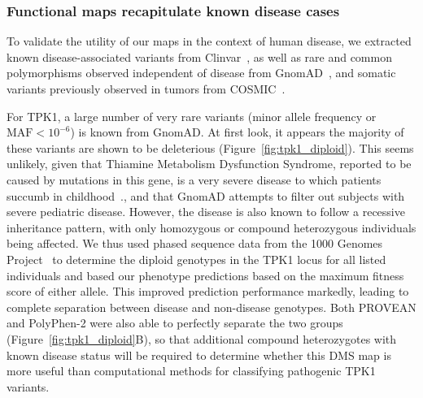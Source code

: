 \subsubsection{Functional maps recapitulate known disease cases}

To validate the utility of our maps in the context of human disease, we extracted known disease-associated variants from Clinvar~\cite{landrum_clinvar:_2016}, as well as rare and common polymorphisms observed independent of disease from GnomAD~\cite{lek_analysis_2016}, and somatic variants previously observed in tumors from COSMIC~\cite{forbes_cosmic:_2001}. 

For TPK1, a large number of very rare variants (minor allele frequency or $\text{MAF} < 10^{-6}$) is known from GnomAD. At first look, it appears the majority of these variants are shown to be deleterious (Figure~\ref{fig:tpk1_diploid}). This seems unlikely, given that Thiamine Metabolism Dysfunction Syndrome, reported to be caused by mutations in this gene, is a very severe disease to which patients succumb in childhood~\cite{mayr_thiamine_2011}., and that GnomAD attempts to filter out subjects with severe pediatric disease. However, the disease is also known to follow a recessive inheritance pattern, with only homozygous or compound heterozygous individuals being affected. We thus used phased sequence data from the 1000 Genomes Project~\cite{the_1000_genomes_project_consortium_global_2015} to determine the diploid genotypes in the TPK1 locus for all listed individuals and based our phenotype predictions based on the maximum fitness score of either allele. This improved prediction performance markedly, leading to complete separation between disease and non-disease genotypes. Both PROVEAN and PolyPhen-2 were also able to perfectly separate the two groups (Figure~\ref{fig:tpk1_diploid}B), so that additional compound heterozygotes with known disease status will be required to determine whether this DMS map is more useful than computational methods for classifying pathogenic TPK1 variants. 

